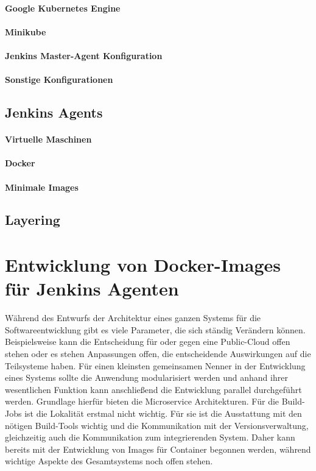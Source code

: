 \paragraph{Google Kubernetes Engine}

\paragraph{Minikube}



\paragraph{Jenkins Master-Agent Konfiguration}


\paragraph{Sonstige Konfigurationen}

\subsection{Jenkins Agents}

\paragraph{Virtuelle Maschinen}

\paragraph{Docker}

\paragraph{Minimale Images}

\subsection{Layering}

\section{Entwicklung von Docker-Images für Jenkins Agenten}

Während des Entwurfs der Architektur eines ganzen Systems für die Softwareentwicklung gibt es viele Parameter, die sich ständig Verändern können. Beispielsweise kann die Entscheidung für oder gegen eine Public-Cloud offen stehen oder es stehen Anpassungen offen, die entscheidende Auswirkungen auf die Teilsysteme haben.
Für einen kleinsten gemeinsamen Nenner in der Entwicklung eines Systems sollte die Anwendung modularisiert werden und anhand ihrer wesentlichen Funktion kann anschließend die Entwicklung parallel durchgeführt werden. Grundlage hierfür bieten die Microservice Architekturen. Für die Build-Jobs ist die Lokalität erstmal nicht wichtig. Für sie ist die Ausstattung mit den nötigen Build-Tools wichtig und die Kommunikation mit der Versionsverwaltung, gleichzeitig auch die Kommunikation zum integrierenden System. Daher kann bereits mit der Entwicklung von Images für Container begonnen werden, während wichtige Aspekte des Gesamtsystems noch offen stehen.

